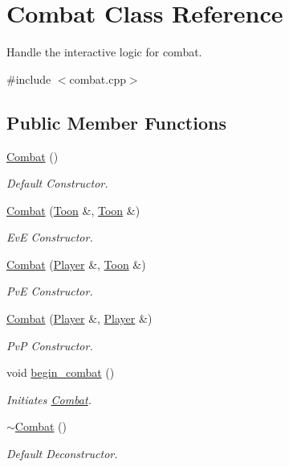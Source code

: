 \hypertarget{classCombat}{}\section{Combat Class Reference}
\label{classCombat}


Handle the interactive logic for combat.  




{\ttfamily \#include $<$combat.\+cpp$>$}

\subsection*{Public Member Functions}
\begin{DoxyCompactItemize}
\item 
\mbox{\hyperlink{classCombat_a4c2dfed2f9da749ae341de25c7427f73}{Combat}} ()
\begin{DoxyCompactList}\small\item\em Default Constructor. \end{DoxyCompactList}\item 
\mbox{\hyperlink{classCombat_a795ca85f83c3692b12ed7e461011e759}{Combat}} (\mbox{\hyperlink{classToon}{Toon}} \&, \mbox{\hyperlink{classToon}{Toon}} \&)
\begin{DoxyCompactList}\small\item\em EvE Constructor. \end{DoxyCompactList}\item 
\mbox{\hyperlink{classCombat_a53043f57b226ad771f55e55641d532e2}{Combat}} (\mbox{\hyperlink{classPlayer}{Player}} \&, \mbox{\hyperlink{classToon}{Toon}} \&)
\begin{DoxyCompactList}\small\item\em PvE Constructor. \end{DoxyCompactList}\item 
\mbox{\hyperlink{classCombat_adbb58cb73a7a85ab388cdecb9e15276c}{Combat}} (\mbox{\hyperlink{classPlayer}{Player}} \&, \mbox{\hyperlink{classPlayer}{Player}} \&)
\begin{DoxyCompactList}\small\item\em PvP Constructor. \end{DoxyCompactList}\item 
void \mbox{\hyperlink{classCombat_a466fcd2a5dd79b9288bdfc75fdfff870}{begin\+\_\+combat}} ()
\begin{DoxyCompactList}\small\item\em Initiates \mbox{\hyperlink{classCombat}{Combat}}. \end{DoxyCompactList}\item 
\mbox{\label{classCombat_a044df77ec24b76ca8b1cc3dde0de5049}} 
\mbox{\hyperlink{classCombat_a044df77ec24b76ca8b1cc3dde0de5049}{$\sim$\+Combat}} ()
\begin{DoxyCompactList}\small\item\em Default Deconstructor. \end{DoxyCompactList}\end{DoxyCompactItemize}


